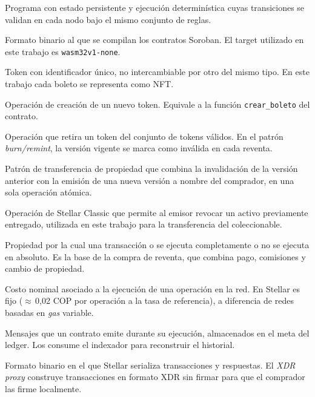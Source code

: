 \begin{description}\setlength{\itemsep}{2pt}
\item[Contrato inteligente] Programa con estado persistente y ejecución determinística cuyas transiciones se validan en cada nodo bajo el mismo conjunto de reglas.
\item[WASM (WebAssembly)] Formato binario al que se compilan los contratos Soroban. El target utilizado en este trabajo es \texttt{wasm32v1-none}.
\item[NFT (\textit{Non-Fungible Token})] Token con identificador único, no intercambiable por otro del mismo tipo. En este trabajo cada boleto se representa como NFT.
\item[\textit{Mint} (acuñación)] Operación de creación de un nuevo token. Equivale a la función \texttt{crear\_boleto} del contrato.
\item[\textit{Burn} (quema)] Operación que retira un token del conjunto de tokens válidos. En el patrón \textit{burn/remint}, la versión vigente se marca como inválida en cada reventa.
\item[\textit{Burn/remint}] Patrón de transferencia de propiedad que combina la invalidación de la versión anterior con la emisión de una nueva versión a nombre del comprador, en una sola operación atómica.
\item[\textit{Clawback}] Operación de Stellar Classic que permite al emisor revocar un activo previamente entregado, utilizada en este trabajo para la transferencia del coleccionable.
\item[Atomicidad] Propiedad por la cual una transacción o se ejecuta completamente o no se ejecuta en absoluto. Es la base de la compra de reventa, que combina pago, comisiones y cambio de propiedad.
\item[\textit{Gas fee} / Comisión] Costo nominal asociado a la ejecución de una operación en la red. En Stellar es fijo ($\approx$\,0{,}02 COP por operación a la tasa de referencia), a diferencia de redes basadas en \textit{gas} variable.
\item[Eventos (\textit{events})] Mensajes que un contrato emite durante su ejecución, almacenados en el meta del ledger. Los consume el indexador para reconstruir el historial.
\item[XDR (\textit{External Data Representation})] Formato binario en el que Stellar serializa transacciones y respuestas. El \textit{XDR proxy} construye transacciones en formato XDR sin firmar para que el comprador las firme localmente.
\end{description}

